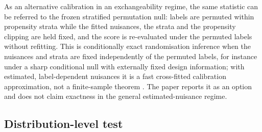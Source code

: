 As an alternative calibration in an exchangeability regime, the same statistic can be referred to
the frozen stratified permutation null: labels are permuted within propensity strata while the
fitted nuisances, the strata and the propensity clipping are held fixed, and the score is
re-evaluated under the permuted labels without refitting. This is conditionally exact
randomisation inference when the nuisances and strata are fixed independently of the permuted
labels, for instance under a sharp conditional null with externally fixed design information; with
estimated, label-dependent nuisances it is a fast cross-fitted calibration approximation, not a
finite-sample theorem \cite{chung_romano_2013,janssen_1997}. The paper reports it as an option and
does not claim exactness in the general estimated-nuisance regime.

\subsection{Distribution-level test}

